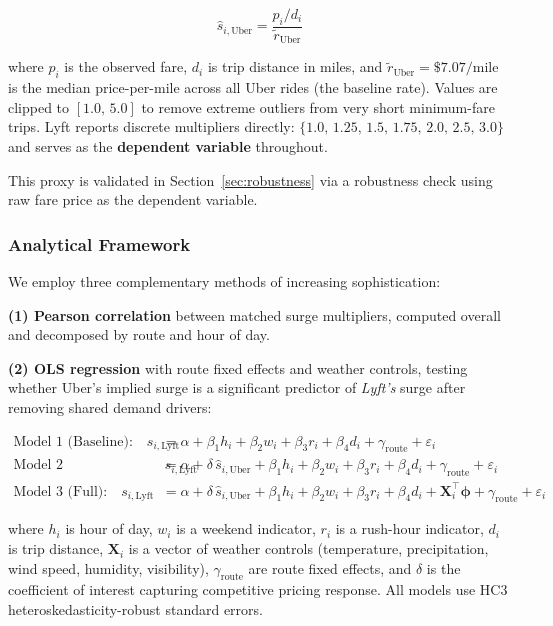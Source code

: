 \documentclass[11pt, letterpaper]{article}
\begin{document}
\begin{equation}
\hat{s}_{i,\text{Uber}} = \frac{p_i / d_i}{\tilde{r}_{\text{Uber}}}
\label{eq:implied_surge}
\end{equation}

where $p_i$ is the observed fare, $d_i$ is trip distance in miles, and
$\tilde{r}_{\text{Uber}} = \$7.07\text{/mile}$ is the median
price-per-mile across all Uber rides (the baseline rate). Values are
clipped to $[1.0,\,5.0]$ to remove extreme outliers from very short
minimum-fare trips. Lyft reports discrete multipliers directly:
$\{1.0,\,1.25,\,1.5,\,1.75,\,2.0,\,2.5,\,3.0\}$ and serves as the
\textbf{dependent variable} throughout.

This proxy is validated in Section~\ref{sec:robustness} via a
robustness check using raw fare price as the dependent variable.

\subsubsection{Analytical Framework}

We employ three complementary methods of increasing sophistication:

\textbf{(1) Pearson correlation} between matched surge multipliers,
computed overall and decomposed by route and hour of day.

\textbf{(2) OLS regression} with route fixed effects and weather
controls, testing whether Uber's implied surge is a significant
predictor of \textit{Lyft's} surge after removing shared demand drivers:

\begin{align}
\text{Model 1 (Baseline):} \quad
s_{i,\text{Lyft}} &= \alpha + \beta_1 h_i + \beta_2 w_i +
\beta_3 r_i + \beta_4 d_i + \gamma_{\text{route}} + \varepsilon_i
\label{eq:m1} \\[6pt]
\text{Model 2 (Competitive):} \quad
s_{i,\text{Lyft}} &= \alpha + \delta\,\hat{s}_{i,\text{Uber}} +
\beta_1 h_i + \beta_2 w_i + \beta_3 r_i + \beta_4 d_i +
\gamma_{\text{route}} + \varepsilon_i
\label{eq:m2} \\[6pt]
\text{Model 3 (Full):} \quad
s_{i,\text{Lyft}} &= \alpha + \delta\,\hat{s}_{i,\text{Uber}} +
\beta_1 h_i + \beta_2 w_i + \beta_3 r_i + \beta_4 d_i +
\mathbf{X}_i^\top\boldsymbol{\phi} + \gamma_{\text{route}} + \varepsilon_i
\label{eq:m3}
\end{align}

where $h_i$ is hour of day, $w_i$ is a weekend indicator, $r_i$ is a
rush-hour indicator, $d_i$ is trip distance, $\mathbf{X}_i$ is a vector
of weather controls (temperature, precipitation, wind speed, humidity,
visibility), $\gamma_{\text{route}}$ are route fixed effects, and
$\delta$ is the coefficient of interest capturing competitive pricing
response. All models use HC3 heteroskedasticity-robust standard errors.
\end{document}
